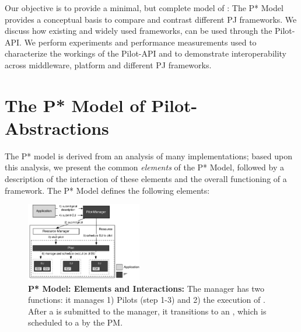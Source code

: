 \documentclass{sig-alternate}
\begin{document}
Our objective is to provide a minimal, but complete model of
\pilotjobs: The P* Model provides a conceptual basis to compare and
contrast different PJ frameworks.  We discuss how existing and widely
used \pilotjob frameworks, can be used through the Pilot-API. We
perform experiments and performance measurements used to characterize
the workings of the Pilot-API and to demonstrate interoperability
across middleware, platform and different PJ frameworks. 










\section{The P* Model of Pilot-\\Abstractions}
\label{sec:pilot-model}

The P* model is derived from an analysis of many \pilotjob implementations;
based upon this analysis, we present the common {\it elements} of the P*
Model, followed by a description of the interaction of these elements and the
overall functioning of a \pilotjob framework. The P* Model defines the
following elements:

\begin{figure}[t]
	\upp\upp
    \centering
    \includegraphics[width=0.45\textwidth]{figures/pstar_model_single.pdf}
    \caption{ \textbf{P* Model: Elements and
        Interactions:} The manager has two functions: it manages 1)
      Pilots (step 1-3) and 2) the execution of \cus. After a \cu is
      submitted to the manager, it transitions to an \su, which is
      scheduled to a \pilot by the PM.}
	\upp\upp
    \label{fig:figures_pstar}
\end{figure}
\end{document}
